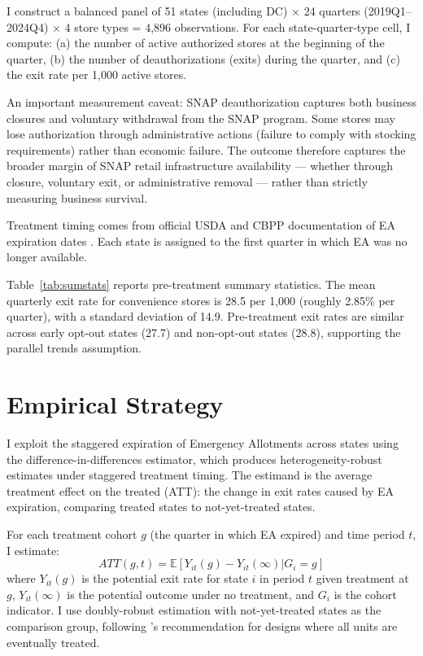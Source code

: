 \documentclass[12pt]{article}
\newcommand{\E}{\mathbb{E}}
\begin{document}
I construct a balanced panel of 51 states (including DC) $\times$ 24 quarters (2019Q1--2024Q4) $\times$ 4 store types = 4,896 observations. For each state-quarter-type cell, I compute: (a) the number of active authorized stores at the beginning of the quarter, (b) the number of deauthorizations (exits) during the quarter, and (c) the exit rate per 1,000 active stores.

An important measurement caveat: SNAP deauthorization captures both business closures and voluntary withdrawal from the SNAP program. Some stores may lose authorization through administrative actions (failure to comply with stocking requirements) rather than economic failure. The outcome therefore captures the broader margin of SNAP retail infrastructure availability --- whether through closure, voluntary exit, or administrative removal --- rather than strictly measuring business survival.

Treatment timing comes from official USDA and CBPP documentation of EA expiration dates \citep{rosenbaum2023hunger, lakhani2024snap}. Each state is assigned to the first quarter in which EA was no longer available.



Table~\ref{tab:sumstats} reports pre-treatment summary statistics. The mean quarterly exit rate for convenience stores is 28.5 per 1,000 (roughly 2.85\% per quarter), with a standard deviation of 14.9. Pre-treatment exit rates are similar across early opt-out states (27.7) and non-opt-out states (28.8), supporting the parallel trends assumption.

\section{Empirical Strategy}

I exploit the staggered expiration of Emergency Allotments across states using the \citet{callaway2021difference} difference-in-differences estimator, which produces heterogeneity-robust estimates under staggered treatment timing. The estimand is the average treatment effect on the treated (ATT): the change in exit rates caused by EA expiration, comparing treated states to not-yet-treated states.

For each treatment cohort $g$ (the quarter in which EA expired) and time period $t$, I estimate:
\begin{equation}
ATT(g,t) = \E[Y_{it}(g) - Y_{it}(\infty) | G_i = g]
\end{equation}
where $Y_{it}(g)$ is the potential exit rate for state $i$ in period $t$ given treatment at $g$, $Y_{it}(\infty)$ is the potential outcome under no treatment, and $G_i$ is the cohort indicator. I use doubly-robust estimation with not-yet-treated states as the comparison group, following \citet{callaway2021difference}'s recommendation for designs where all units are eventually treated.
\end{document}
